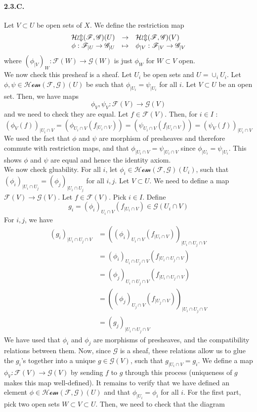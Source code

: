 \documentclass{article}
\newcommand{\applic}[4]{\begin{array}[t]{rcl}
#1 & \to & #2 \\
#3 & \mapsto & #4
\end{array}}
\newcommand{\Fsheaf}{\mathscr{F}}
\newcommand{\Gsheaf}{\mathscr{G}}
\newcommand{\sheafHom}{\mathcal{Hom}}
\begin{document}
\paragraph{2.3.C.} Let $V\subset U$ be open sets of $X$. We define the restriction map
\[\applic{\sheafHom(\Fsheaf,\Gsheaf)(U)}{\sheafHom(\Fsheaf,\Gsheaf)(V)}{\phi : \Fsheaf_{\mid U} \to \Gsheaf_{\mid U}}{\phi_{\mid V} : \Fsheaf_{\mid V} \to \Gsheaf_{\mid V}}\]
where $(\phi_{\mid V})_W : \Fsheaf(W) \to \Gsheaf(W)$ is just $\phi_W$ for $W \subset V$ open. \\
We now check this presheaf is a sheaf. Let $U_i$ be open sets and $U = \cup_i U_i$. Let $\phi,\psi \in \sheafHom(\Fsheaf, \Gsheaf)(U)$ be such that $\phi_{\mid U_i} = \psi_{\mid U_i}$ for all $i$. Let $V \subset U$ be an open set. Then, we have maps 
\[\phi_V,\psi_V : \Fsheaf(V) \to \Gsheaf(V)\]
and we need to check they are equal. Let $f \in \Fsheaf(V)$. Then, for $i \in I$ :
\[(\phi_V (f))_{\mid U_i \cap V}
= (\phi_{U_i \cap V} (f_{\mid U_i \cap V}))
= (\psi_{U_i \cap V} (f_{\mid U_i \cap V}))
= (\psi_V (f))_{\mid U_i \cap V}\]
We used the fact that $\phi$ and $\psi$ are morphism of presheaves and therefore commute with restriction maps, and that $\phi_{\mid U_i \cap V} = \psi_{\mid U_i \cap V}$ since $\phi_{\mid U_i} = \psi_{\mid U_i}$. This shows $\phi$ and $\psi$ are equal and hence the identity axiom. \\
We now check gluability. For all $i$, let $\phi_i \in \sheafHom(\Fsheaf,\Gsheaf)(U_i)$, such that $(\phi_i)_{\mid U_i \cap U_j} = (\phi_j)_{\mid U_i \cap U_j}$ for all $i,j$. Let $V \subset U$. We need to define a map $\Fsheaf(V) \to \Gsheaf(V)$. Let $f \in \Fsheaf(V)$. Pick $i \in I$. Define
\[g_i = (\phi_i)_{U_i \cap V} (f_{\mid U_i \cap V}) \in \Gsheaf(U_i \cap V)\]
For $i,j$, we have
\begin{align*}
    (g_i)_{\mid U_i \cap U_j \cap V} & = ((\phi_i)_{U_i \cap V} (f_{\mid U_i \cap V}))_{\mid U_i \cap U_j \cap V} \\
    & = (\phi_i)_{U_i \cap U_j \cap V} (f_{\mid U_i \cap U_j \cap V}) \\
    & = (\phi_j)_{U_i \cap U_j \cap V} (f_{\mid U_i \cap U_j \cap V}) \\
    & = ((\phi_j)_{U_j \cap V} (f_{\mid U_j \cap V}))_{\mid U_i \cap U_j \cap V} \\
    & = (g_j)_{\mid U_i \cap U_j \cap V}
\end{align*}
We have used that $\phi_i$ and $\phi_j$ are morphisms of presheaves, and the compatibility relations between them. Now, since $\Gsheaf$ is a sheaf, these relations allow us to glue the $g_i$'s together into a unique $g \in \Gsheaf(V)$, such that $g_{\mid U_i \cap V} = g_i$. We define a map $\phi_V : \Fsheaf(V) \to \Gsheaf(V)$ by sending $f$ to $g$ through this process (uniqueness of $g$ makes this map well-defined). It remains to verify that we have defined an element $\phi \in \sheafHom(\Fsheaf,\Gsheaf)(U)$ and that $\phi_{\mid U_i} = \phi_i$ for all $i$. For the first part, pick two open sets $W \subset V \subset U$. Then, we need to check that the diagram
\end{document}
